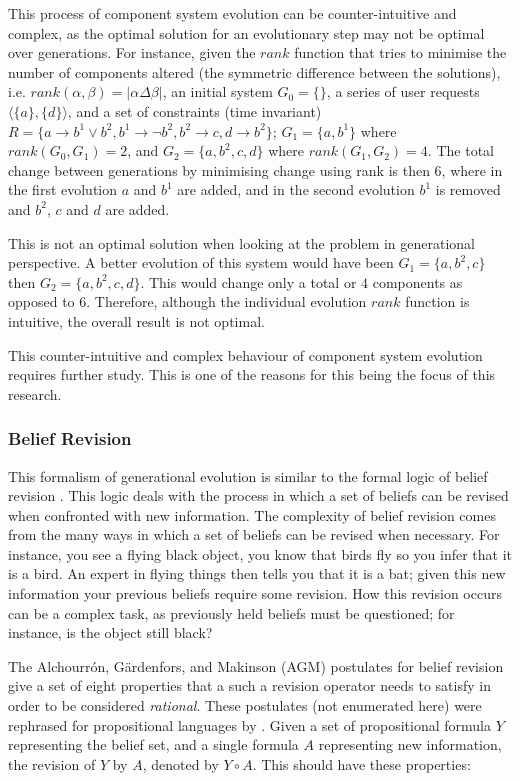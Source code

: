 This process of component system evolution can be counter-intuitive and complex, as the optimal solution for an evolutionary step may not be optimal over generations.
For instance, given the $rank$ function that tries to minimise the number of components altered (the symmetric difference between the solutions), i.e. $rank(\alpha,\beta) = |\alpha \Delta \beta|$,
an initial system $G_0 = \{\}$, a series of user requests $\langle \{a\}, \{d\}\rangle$, 
and a set of constraints (time invariant) $R = \{a \rightarrow b^1 \vee b^2, b^1 \rightarrow \neg b^2, b^2 \rightarrow c, d \rightarrow b^2\}$;
$G_1 = \{a,b^1\}$ where $rank(G_0,G_1) = 2$, and $G_2 = \{a,b^2,c,d\}$ where $rank(G_1,G_2) = 4$.
The total change between generations by minimising change using rank is then $6$, where in the first evolution $a$ and $b^1$ are added, 
and in the second evolution $b^1$ is removed and $b^2$, $c$ and $d$ are added.

This is not an optimal solution when looking at the problem in generational perspective.
A better evolution of this system would have been $G_1 = \{a,b^2,c\}$ then $G_2 = \{a,b^2,c,d\}$.
This would change only a total or $4$ components as opposed to $6$.
Therefore, although the individual evolution $rank$ function is intuitive, the overall result is not optimal.

This counter-intuitive and complex behaviour of component system evolution requires further study.
This is one of the reasons for this being the focus of this research. 

\subsubsection{Belief Revision}
This formalism of generational evolution is similar to the formal logic of belief revision \citep{alchourron1985logic}.
This logic deals with the process in which a set of beliefs can be revised when confronted with new information.
The complexity of belief revision comes from the many ways in which a set of beliefs can be revised when necessary.
For instance, you see a flying black object, you know that birds fly so you infer that it is a bird.
An expert in flying things then tells you that it is a bat; given this new information your previous beliefs require some revision.
How this revision occurs can be a complex task, as previously held beliefs must be questioned; for instance, is the object still black?

The Alchourrón, G\"ardenfors, and Makinson (AGM) \citep{alchourron1985logic} postulates for belief revision give a set of eight properties 
that a such a revision operator needs to satisfy in order to be considered \textit{rational}.
These postulates (not enumerated here) were rephrased for propositional languages by \citep{katsuno1991propositional}. 
Given a set of propositional formula $Y$ representing the belief set, and a single formula $A$ representing new information, the revision of $Y$ by $A$, denoted by $Y \circ A$.
This should have these properties:


